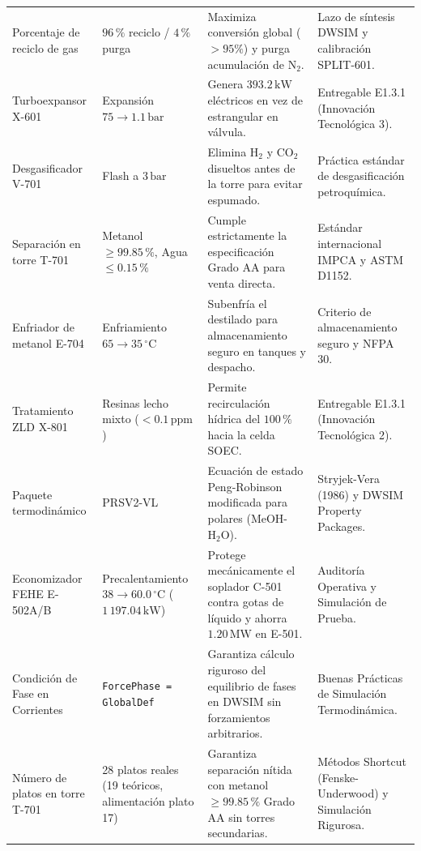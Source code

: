 \documentclass[11pt,a4paper]{article}
\begin{document}
\begin{longtable}{p{3.8cm} p{3.2cm} p{4.2cm} p{3.8cm}}
Porcentaje de reciclo de gas & $96\,\%$ reciclo / $4\,\%$ purga & Maximiza conversión global ($>95\%$) y purga acumulación de $\text{N}_2$. & Lazo de síntesis DWSIM y calibración SPLIT-601. \\
Turboexpansor X-601 & Expansión $75 \to 1.1\,\text{bar}$ & Genera $393.2\,\text{kW}$ eléctricos en vez de estrangular en válvula. & Entregable E1.3.1 (Innovación Tecnológica 3). \\
Desgasificador V-701 & Flash a $3\,\text{bar}$ & Elimina $\text{H}_2$ y $\text{CO}_2$ disueltos antes de la torre para evitar espumado. & Práctica estándar de desgasificación petroquímica. \\
Separación en torre T-701 & Metanol $\ge 99.85\,\%$, Agua $\le 0.15\,\%$ & Cumple estrictamente la especificación Grado AA para venta directa. & Estándar internacional IMPCA y ASTM D1152. \\
Enfriador de metanol E-704 & Enfriamiento $65 \to 35\,^\circ\text{C}$ & Subenfría el destilado para almacenamiento seguro en tanques y despacho. & Criterio de almacenamiento seguro y NFPA 30. \\
Tratamiento ZLD X-801 & Resinas lecho mixto ($<0.1\,\text{ppm}$) & Permite recirculación hídrica del $100\,\%$ hacia la celda SOEC. & Entregable E1.3.1 (Innovación Tecnológica 2). \\
Paquete termodinámico & PRSV2-VL & Ecuación de estado Peng-Robinson modificada para polares ($\text{MeOH}$-$\text{H}_2\text{O}$). & Stryjek-Vera (1986) y DWSIM Property Packages. \\
Economizador FEHE E-502A/B & Precalentamiento $38 \to 60.0\,^\circ\text{C}$ ($1\,197.04\,\text{kW}$) & Protege mecánicamente el soplador C-501 contra gotas de líquido y ahorra $1.20\,\text{MW}$ en E-501. & Auditoría Operativa y Simulación de Prueba. \\
Condición de Fase en Corrientes & \texttt{ForcePhase = GlobalDef} & Garantiza cálculo riguroso del equilibrio de fases en DWSIM sin forzamientos arbitrarios. & Buenas Prácticas de Simulación Termodinámica. \\
Número de platos en torre T-701 & 28 platos reales (19 teóricos, alimentación plato 17) & Garantiza separación nítida con metanol $\ge 99.85\,\%$ Grado AA sin torres secundarias. & Métodos Shortcut (Fenske-Underwood) y Simulación Rigurosa. \\
\bottomrule
\end{longtable}

\end{document}
